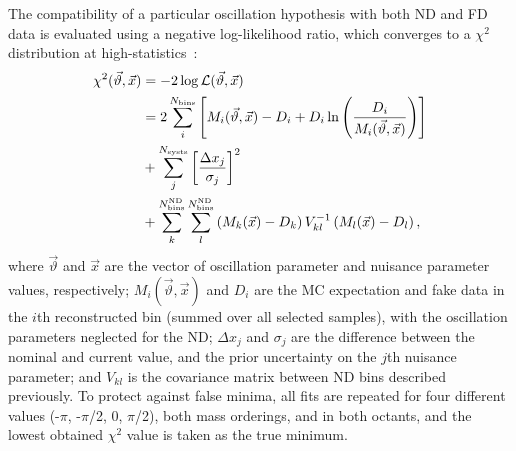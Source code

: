 The compatibility of a particular oscillation hypothesis with both ND and FD data is evaluated using a negative log-likelihood ratio, which converges to a $\chi^{2}$ distribution at high-statistics~\cite{Tanabashi:2018oca}:
\begin{equation}
\begin{aligned}
  \chi^2(\vec{\vartheta}, \vec{x}) &= -2\log\mathcal{L}(\vec{\vartheta}, \vec{x}) \\
  &= 2\sum_i^{N_{\rm bins}}\left[ M_i(\vec{\vartheta}, \vec{x})-D_i+D_i\ln\left({D_i\over M_i(\vec{\vartheta}, \vec{x})}\right) \right] \\
  &+ \sum_{j}^{N_{\mathrm{systs}}}\left[ \frac{\Delta x_{j}}{\sigma_{j}} \right]^{2} \\
  &+ \sum^{N^{\mathrm{ND}}_{\mathrm{bins}}}_{k}\sum^{N^{\mathrm{ND}}_{\mathrm{bins}}}_{l} \left(M_k(\vec{x})-D_k \right) V^{-1}_{kl}\left(M_l(\vec{x})-D_l \right),
\end{aligned}
\label{eq:chisq}
\end{equation}
where $\vec{\vartheta}$ and $\vec{x}$ are the vector of oscillation parameter and nuisance parameter values, respectively; $M_i(\vec{\vartheta}, \vec{x})$ and $D_{i}$ are the MC expectation and fake data in the $i$th reconstructed bin (summed over all selected samples), with the oscillation parameters neglected for the ND; $\Delta x_{j}$ and $\sigma_{j}$ are the difference between the nominal and current value, and the prior uncertainty on the $j$th nuisance parameter; and $V_{kl}$ is the covariance matrix between ND bins described previously. To protect against false minima, all fits are repeated for four different \deltacp values (-$\pi$, -$\pi$/2, 0, $\pi$/2), both mass orderings, and in both  octants, and the lowest obtained $\chi^{2}$ value is taken as the true minimum.

